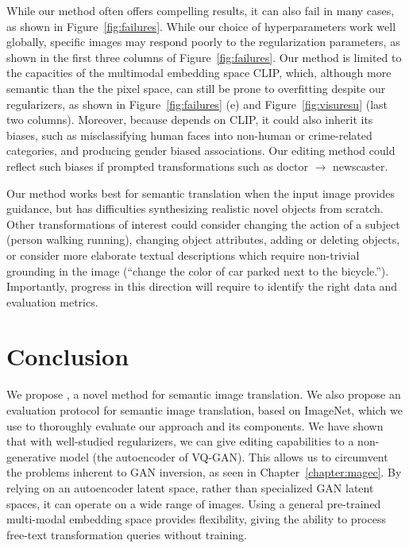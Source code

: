 While our method  often offers compelling results, it can also fail in many cases, 
as shown in Figure~\ref{fig:failures}. While our choice of hyperparameters work well 
globally, specific images may respond poorly to the regularization parameters, as shown 
in the first three columns of Figure~\ref{fig:failures}. Our method is limited to the capacities 
of the multimodal embedding space \ac{CLIP}, which, although more semantic than the the pixel space, 
can still be prone to overfitting despite our regularizers, as shown in Figure~\ref{fig:failures} (e) 
and Figure~\ref{fig:visuresu} (last two columns). Moreover, because \ours depends on \ac{CLIP}, 
it could also inherit its biases,
such as misclassifying human faces into non-human or crime-related categories, and 
producing gender biased associations. Our editing method could reflect such biases if 
prompted transformations such as doctor $\rightarrow$ newscaster.

Our method 
works best for semantic translation when the input image provides guidance,
 but has difficulties synthesizing realistic novel objects from scratch. Other transformations 
 of interest could consider changing the 
action of a subject (person walking \vs  running), changing object attributes, 
adding or deleting objects, or consider more elaborate textual descriptions which 
require non-trivial grounding in the image (``change the color of car parked next to 
the bicycle.''). Importantly, progress in this direction will require to identify the 
right data and evaluation metrics. 




\section{Conclusion}

 We propose \ours, a novel method for semantic image translation.
 We also propose an evaluation protocol for semantic image translation, based on ImageNet,
 which we use to thoroughly evaluate our approach and its components.
 We have shown that with well-studied regularizers, we can give editing capabilities 
 to a non-generative model (the autoencoder of VQ-GAN). This allows us to circumvent the 
 problems inherent to \ac{GAN} inversion, as seen in Chapter~\ref{chapter:magec}.
 By relying on an autoencoder latent space, rather than specialized \ac{GAN} latent spaces,
 it can operate on a wide range of images. Using a general pre-trained multi-modal 
 embedding space provides  flexibility, giving 
 \ours the ability to process free-text transformation queries without training.

